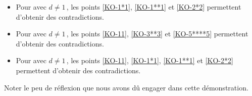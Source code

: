 \begin{multicols}{2}
    \begin{center}
    \end{center}

\columnbreak

    \begin{center}
    \end{center}
\end{multicols}

	
\begin{itemize}
	\item Pour  avec $d \neq 1$\,, les points 
	\ref{KO-1*1},
	\ref{KO-1**1} 
	et
	\ref{KO-2*2}
	permettent d'obtenir des contradictions.
	
	

	\item Pour  avec $d \neq 1$\,, les points 
	\ref{KO-11},
	\ref{KO-3**3}
	et
	\ref{KO-5****5}
	permettent d'obtenir des contradictions.



	\item Pour  avec $d \neq 1$\,, les points 
	\ref{KO-11},
	\ref{KO-1*1},
	\ref{KO-1**1}
	et
	\ref{KO-2*2}
	permettent d'obtenir des contradictions.

	\sfremainKO
\end{itemize}

Noter le peu de réflexion que nous avons dû engager dans cette démonstration.